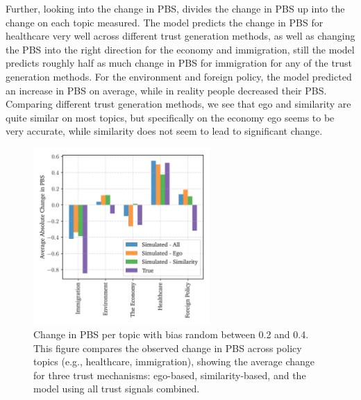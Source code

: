 Further, looking into the change in PBS,  divides the
change in PBS up into the change on each topic measured. The model predicts the
change in PBS for healthcare very well across different trust generation methods, as well as
changing the PBS into the right direction for the economy and immigration,
still the model predicts roughly half as much change in PBS for immigration for
any of the trust generation methods. For the environment and
foreign policy, the model predicted an increase in PBS on average,
while in reality people decreased their PBS. Comparing different trust
generation methods, we see that ego and similarity are quite similar on most
topics, but specifically on the economy ego seems to be very accurate, while
similarity does not seem to lead to significant change.

\begin{figure}[ht]
	\begin{center}
		\includegraphics[width=0.6\textwidth]{Figures/per_topic_change.png}
	\end{center}
	\caption{
		Change in PBS per topic with bias random between 0.2 and 0.4. This figure compares the observed change in PBS across policy topics (e.g., healthcare, immigration), showing the average change for three trust mechanisms: ego-based, similarity-based, and the model using all trust signals combined.
	}\label{fig:per_topic}
\end{figure}

